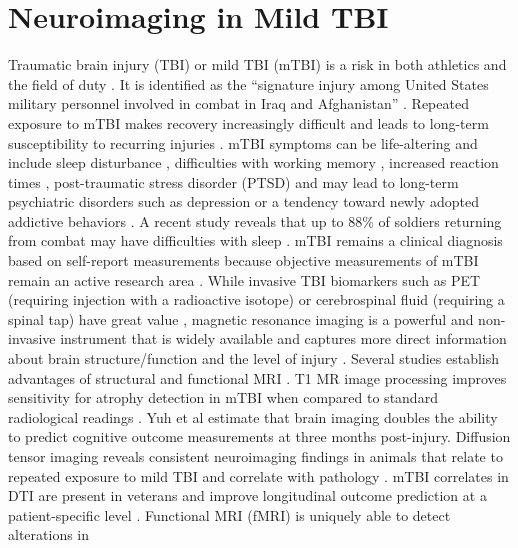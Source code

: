 \documentclass[preprint,1p,times]{elsarticle}
\begin{document}
\section{Neuroimaging in Mild TBI}
Traumatic brain injury (TBI) or mild TBI (mTBI) is a risk in both athletics and the
field of duty
\cite{Toblin2012,Peskind2013,Small2013,Kontos2013,Gosselin2012,Zuckerman2012}.
It is identified as the ``signature injury among United States
military personnel involved in combat in Iraq and Afghanistan''
\cite{McCrea2008,Rigg2011}.  
Repeated exposure to mTBI makes recovery increasingly difficult and
leads to long-term susceptibility to recurring injuries
\cite{Shively2012}.  %
mTBI symptoms can be life-altering and
include sleep disturbance \cite{Mysliwiec2013}, difficulties with
working memory \cite{Bryer2013}, increased reaction times
\cite{Luethcke2011}, post-traumatic stress disorder (PTSD)
\cite{Toblin2012,Bazarian2013} and may
lead to long-term psychiatric disorders such as depression
\cite{Mayer2011,Rapp2012,Toblin2012} or a tendency toward newly adopted addictive
behaviors \cite{Miller2013}.  A recent study reveals that up
to 88\% of soldiers returning from combat may have difficulties with sleep
\cite{Mysliwiec2013}.  %
mTBI remains a clinical diagnosis \cite{MacDonald2011} based on self-report measurements
because objective measurements of mTBI remain an active research area \cite{Rapp2012}.
While invasive TBI biomarkers such as PET (requiring injection with a
radioactive isotope) \cite{Small2013} or cerebrospinal fluid
(requiring a spinal tap) have great value \cite{Zetterberg2013}, magnetic resonance imaging
is a powerful and non-invasive instrument that is widely available and captures more direct
information about brain structure/function and the level of injury
\cite{Fox2013}.  Several studies establish advantages of structural
and functional MRI \cite{Ross2013,Yuh2013,Mayer2011,Morey2012}.
T1 MR image processing improves sensitivity for
atrophy detection in mTBI when compared to standard radiological readings \cite{Ross2013}.  Yuh et al \cite{Yuh2013}
estimate that brain imaging doubles the ability to predict cognitive
outcome measurements at three months post-injury.  Diffusion tensor
imaging reveals consistent neuroimaging findings in animals that
relate to repeated exposure to mild TBI and correlate with pathology
\cite{Bennett2012}.  mTBI correlates in DTI are present in veterans
\cite{Morey2012,Jorge2012} and improve longitudinal outcome prediction
at a patient-specific level \cite{Sidaros2008}.  Functional MRI (fMRI) is uniquely able to detect alterations in
\end{document}
